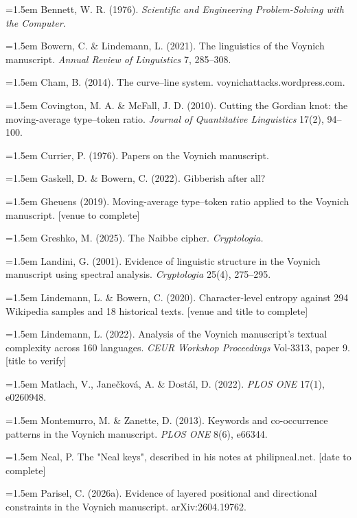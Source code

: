 \documentclass[11pt,a4paper]{article}
\begin{document}
\noindent\hangindent=1.5em Bennett, W. R. (1976). \emph{Scientific and Engineering Problem-Solving with the Computer.}\par
\noindent\hangindent=1.5em Bowern, C. \& Lindemann, L. (2021). The linguistics of the Voynich manuscript. \emph{Annual Review of Linguistics} 7, 285--308.\par
\noindent\hangindent=1.5em Cham, B. (2014). The curve--line system. voynichattacks.wordpress.com.\par
\noindent\hangindent=1.5em Covington, M. A. \& McFall, J. D. (2010). Cutting the Gordian knot: the moving-average type--token ratio. \emph{Journal of Quantitative Linguistics} 17(2), 94--100.\par
\noindent\hangindent=1.5em Currier, P. (1976). Papers on the Voynich manuscript.\par
\noindent\hangindent=1.5em Gaskell, D. \& Bowern, C. (2022). Gibberish after all?\par
\noindent\hangindent=1.5em Gheuens (2019). Moving-average type--token ratio applied to the Voynich manuscript. [venue to complete]\par
\noindent\hangindent=1.5em Greshko, M. (2025). The Naibbe cipher. \emph{Cryptologia.}\par
\noindent\hangindent=1.5em Landini, G. (2001). Evidence of linguistic structure in the Voynich manuscript using spectral analysis. \emph{Cryptologia} 25(4), 275--295.\par
\noindent\hangindent=1.5em Lindemann, L. \& Bowern, C. (2020). Character-level entropy against 294 Wikipedia samples and 18 historical texts. [venue and title to complete]\par
\noindent\hangindent=1.5em Lindemann, L. (2022). Analysis of the Voynich manuscript's textual complexity across 160 languages. \emph{CEUR Workshop Proceedings} Vol-3313, paper 9. [title to verify]\par
\noindent\hangindent=1.5em Matlach, V., Janečková, A. \& Dostál, D. (2022). \emph{PLOS ONE} 17(1), e0260948.\par
\noindent\hangindent=1.5em Montemurro, M. \& Zanette, D. (2013). Keywords and co-occurrence patterns in the Voynich manuscript. \emph{PLOS ONE} 8(6), e66344.\par
\noindent\hangindent=1.5em Neal, P. The "Neal keys", described in his notes at philipneal.net. [date to complete]\par
\noindent\hangindent=1.5em Parisel, C. (2026a). Evidence of layered positional and directional constraints in the Voynich manuscript. arXiv:2604.19762.\par
\end{document}

